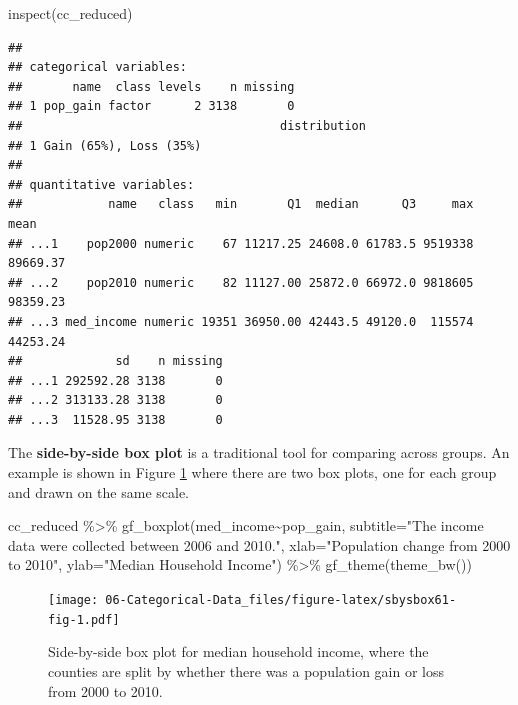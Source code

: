 \documentclass[
]{book}
\newenvironment{Shaded}{\begin{snugshade}}{\end{snugshade}}
\newcommand{\AttributeTok}[1]{\textcolor[rgb]{0.77,0.63,0.00}{#1}}
\newcommand{\FunctionTok}[1]{\textcolor[rgb]{0.00,0.00,0.00}{#1}}
\newcommand{\NormalTok}[1]{#1}
\newcommand{\SpecialCharTok}[1]{\textcolor[rgb]{0.00,0.00,0.00}{#1}}
\newcommand{\StringTok}[1]{\textcolor[rgb]{0.31,0.60,0.02}{#1}}
\begin{document}
\begin{Shaded}
\begin{Highlighting}[]
\FunctionTok{inspect}\NormalTok{(cc\_reduced)}
\end{Highlighting}
\end{Shaded}

\begin{verbatim}
## 
## categorical variables:  
##       name  class levels    n missing
## 1 pop_gain factor      2 3138       0
##                                    distribution
## 1 Gain (65%), Loss (35%)                       
## 
## quantitative variables:  
##            name   class   min       Q1  median      Q3     max     mean
## ...1    pop2000 numeric    67 11217.25 24608.0 61783.5 9519338 89669.37
## ...2    pop2010 numeric    82 11127.00 25872.0 66972.0 9818605 98359.23
## ...3 med_income numeric 19351 36950.00 42443.5 49120.0  115574 44253.24
##             sd    n missing
## ...1 292592.28 3138       0
## ...2 313133.28 3138       0
## ...3  11528.95 3138       0
\end{verbatim}

The \textbf{side-by-side box plot} is a traditional tool for comparing across groups. An example is shown in Figure \ref{fig:sbysbox61-fig} where there are two box plots, one for each group and drawn on the same scale.

\begin{Shaded}
\begin{Highlighting}[]
\NormalTok{cc\_reduced }\SpecialCharTok{\%\textgreater{}\%}
  \FunctionTok{gf\_boxplot}\NormalTok{(med\_income}\SpecialCharTok{\textasciitilde{}}\NormalTok{pop\_gain,}
             \AttributeTok{subtitle=}\StringTok{"The income data were collected between 2006 and 2010."}\NormalTok{,}
             \AttributeTok{xlab=}\StringTok{"Population change from 2000 to 2010"}\NormalTok{,}
             \AttributeTok{ylab=}\StringTok{"Median Household Income"}\NormalTok{) }\SpecialCharTok{\%\textgreater{}\%}
  \FunctionTok{gf\_theme}\NormalTok{(}\FunctionTok{theme\_bw}\NormalTok{())}
\end{Highlighting}
\end{Shaded}

\begin{figure}
\centering
\texttt{[image: 06-Categorical-Data\_files/figure-latex/sbysbox61-fig-1.pdf]}
\caption{\label{fig:sbysbox61-fig}Side-by-side box plot for median household income, where the counties are split by whether there was a population gain or loss from 2000 to 2010.}
\end{figure}
\end{document}

